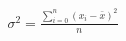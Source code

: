 \documentclass[10pt]{article}
\begin{document}
\begin{align*}\sigma^2 = \frac{\sum\limits_{i=0}^n (x_i - \bar{x})^2}{n}\end{align*}
\end{document}
